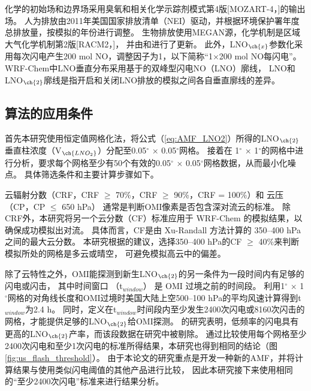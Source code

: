 化学的初始场和边界场采用臭氧和相关化学示踪剂模式第4版[MOZART-4，\citet{Emmons.2010}]的输出场。
人为排放由2011年美国国家排放清单（NEI）驱动，并根据环境保护署年度总排放量，按模拟的年份进行调整\citep{EPA.2015}。
生物排放使用MEGAN源，化学机制是区域大气化学机制第2版[RACM2，\citet{Goliff.2013}]，
并由\citet{Browne.2014}和\citet{Schwantes.2015}进行了更新。
此外，LNO$_{\ch{x}}$参数化采用每次闪电产生200 mol NO，调整因子为1，以下简称“1$\times$200 mol NO每闪电”。
WRF-Chem中LNO垂直分布采用基于\citet{Ott.2010}的双峰型闪电NO（LNO）廓线\citep{Laughner.2017}，
LNO和LNO$_{\ch{2}}$廓线是指开启和关闭LNO排放的模拟之间各自垂直廓线的差异。


\subsection{算法的应用条件}

首先本研究使用恒定值网格化法，将公式（\ref{eq:AMF_LNO2}）所得的LNO$_{\ch{2}}$垂直柱浓度（V$_{\ch{LNO_2}}$）分配至0.05$^{\circ}$ $\times$ 0.05$^{\circ}$网格\citep{Kuhlmann.2014}。
接着在 1$^{\circ}$ $\times$ 1$^{\circ}$的网格中进行分析，要求每个网格至少有50个有效的0.05$^{\circ}$ $\times$ 0.05$^{\circ}$网格数据，从而最小化噪点。
具体筛选条件和主要计算步骤如下。

云辐射分数（CRF，CRF $\geq$ 70\%，CRF $\geq$ 90\%，CRF = 100\%）和 云压（CP，CP $\leq$ 650 hPa）
通常是判断OMI像素是否包含深对流云的标准\citep{Ziemke.2009,Choi.2014,Pickering.2016}。
除CRF外，本研究将另一个云分数（CF）标准应用于 WRF-Chem 的模拟结果，以确保成功模拟出对流。
具体而言，CF是由 Xu-Randall 方法计算的 350--400 hPa 之间的最大云分数\citep{Xu.1996,Strode.2017}。
本研究根据\citet{Strode.2017}的建议，选择350--400 hPa的CF $\geq$ 40\%来判断模拟所处的网格是多云或晴空，
可避免模拟高云中的偏差。

除了云特性之外，OMI能探测到新生LNO$_{\ch{2}}$的另一条件为一段时间内有足够的闪电或闪击，
其中时间窗口 （t$_{window}$） 是 OMI 过境之前的时间段。
\citet{Lapierre.2020}利用1$^{\circ}$ $\times$ 1$^{\circ}$网格的对角线长度和OMI过境时美国大陆上空500--100 hPa的平均风速计算得到t$_{window}$为2.4 h。
同时，\citet{Lapierre.2020}定义在t$_{window}$时间段内至少发生2400次闪电或8160次闪击的网格，才能提供足够的LNO$_{\ch{2}}$给OMI探测。
\citet{Bucsela.2019}的研究表明，低频率的闪电具有更高的LNO$_{\ch{2}}$产率，而该段数据在\citet{Lapierre.2020}研究中被剔除。
通过比较使用每个网格至少2400次闪电和至少1次闪电的标准所得结果，本研究也得到相同的结论（图\ref{fig:us_flash_threshold}）。
由于本论文的研究重点是开发一种新的AMF，并将计算结果与使用类似闪电阈值的其他产品进行比较\citep{Pickering.2016,Lapierre.2020}，
因此本研究接下来使用相同的“至少2400次闪电”标准来进行结果分析。


